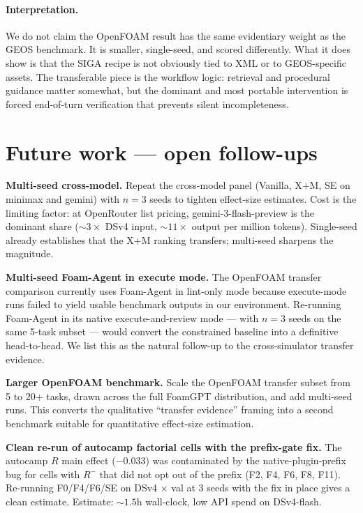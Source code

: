 \documentclass{article}
\begin{document}
\paragraph{Interpretation.}
We do not claim the OpenFOAM result has the same evidentiary weight as the GEOS benchmark. It is smaller, single-seed, and scored differently. What it does show is that the SIGA recipe is not obviously tied to XML or to GEOS-specific assets. The transferable piece is the workflow logic: retrieval and procedural guidance matter somewhat, but the dominant and most portable intervention is forced end-of-turn verification that prevents silent incompleteness.

\section{Future work — open follow-ups}
\label{app:future-work}

\textbf{Multi-seed cross-model.} Repeat the cross-model panel (Vanilla, X+M, SE on minimax and gemini) with $n=3$ seeds to tighten effect-size estimates. Cost is the limiting factor: at OpenRouter list pricing, gemini-3-flash-preview is the dominant share (${\sim}3\times$ DSv4 input, ${\sim}11\times$ output per million tokens). Single-seed already establishes that the X+M ranking transfers; multi-seed sharpens the magnitude.

\textbf{Multi-seed Foam-Agent in execute mode.} The OpenFOAM transfer comparison currently uses Foam-Agent in lint-only mode because execute-mode runs failed to yield usable benchmark outputs in our environment. Re-running Foam-Agent in its native execute-and-review mode --- with $n=3$ seeds on the same 5-task subset --- would convert the constrained baseline into a definitive head-to-head. We list this as the natural follow-up to the cross-simulator transfer evidence.

\textbf{Larger OpenFOAM benchmark.} Scale the OpenFOAM transfer subset from 5 to 20+ tasks, drawn across the full FoamGPT distribution, and add multi-seed runs. This converts the qualitative ``transfer evidence'' framing into a second benchmark suitable for quantitative effect-size estimation.

\textbf{Clean re-run of autocamp factorial cells with the prefix-gate fix.} The autocamp $R$ main effect ($-0.033$) was contaminated by the native-plugin-prefix bug for cells with $R^{-}$ that did not opt out of the prefix (F2, F4, F6, F8, F11). Re-running F0/F4/F6/SE on DSv4 × val at 3 seeds with the fix in place gives a clean estimate. Estimate: ${\sim}1.5$h wall-clock, low API spend on DSv4-flash.
\end{document}
